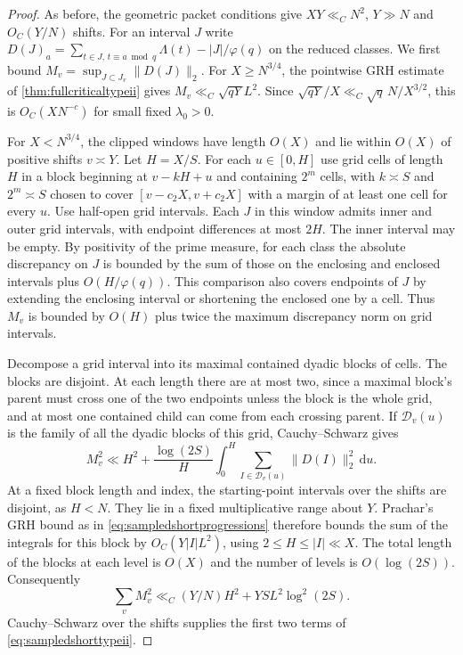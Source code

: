 \documentclass[11pt,a4paper]{article}
\numberwithin{equation}{section}
\newcommand{\ud}{\mathrm d}
\begin{document}
\begin{proof}
As before, the geometric packet conditions give
$XY\ll_C N^2$, $Y\gg N$ and $O_C(Y/N)$ shifts.
For an interval $J$ write
$D(J)_a=\sum_{t\in J,\,t\equiv a\bmod q}\Lambda(t)
       -|J|/\varphi(q)$ on the reduced classes.
We first bound $M_v=\sup_{J\subset J_v}\|D(J)\|_2$.
For $X\ge N^{3/4}$, the pointwise GRH estimate of
\cref{thm:fullcriticaltypeii} gives
$M_v\ll_C \sqrt{qY}L^2$. Since
$\sqrt{qY}/X\ll_C \sqrt q\,N/X^{3/2}$, this is
$O_C(X N^{-c})$ for small fixed $\lambda_0>0$.

For $X<N^{3/4}$, the clipped windows have length $O(X)$
and lie within $O(X)$ of positive shifts $v\asymp Y$.
Let $H=X/S$. For each $u\in[0,H]$ use grid cells of
length $H$ in a block beginning at $v-kH+u$ and containing
$2^m$ cells, with $k\asymp S$ and $2^m\asymp S$ chosen
to cover $[v-c_2 X,v+c_2 X]$ with a margin of at least
one cell for every $u$. Use half-open grid intervals.
Each $J$ in this window admits inner and outer grid
intervals, with endpoint differences at most $2H$.
The inner interval may be empty. By positivity of the
prime measure, for each class the absolute discrepancy
on $J$ is bounded by the sum of those on the enclosing
and enclosed intervals plus $O(H/\varphi(q))$.
This comparison also covers endpoints of $J$ by extending
the enclosing interval or shortening the enclosed one
by a cell. Thus $M_v$ is bounded by
$O(H)$ plus twice the maximum discrepancy norm on
grid intervals.

Decompose a grid interval into its maximal contained
dyadic blocks of cells. The blocks are disjoint. At
each length there are at most two, since a maximal
block's parent must cross one of the two endpoints
unless the block is the whole grid, and at most one
contained child can come from each crossing parent.
If $\mathcal D_v(u)$ is the family of all the dyadic
blocks of this grid, Cauchy--Schwarz gives
\[
 M_v^2 \ll H^2+\frac{\log(2S)}{H}\int_0^H
       \sum_{I\in\mathcal D_v(u)}\|D(I)\|_2^2\,\ud u .
\]
At a fixed block length and index, the starting-point
intervals over the shifts are disjoint, as $H<N$.
They lie in a fixed multiplicative range about $Y$.
Prachar's GRH bound as in \cref{eq:sampledshortprogressions}
therefore bounds the sum of the integrals for this block
by $O_C(Y |I| L^2)$, using $2\le H\le |I|\ll X$.
The total length of the blocks at each level is $O(X)$
and the number of levels is $O(\log(2S))$. Consequently
\[
 \sum_v M_v^2\ll_C (Y/N)H^2+YS L^2\log^2(2S).
\]
Cauchy--Schwarz over the shifts supplies the first
two terms of \cref{eq:sampledshorttypeii}.


\end{proof}
\end{document}
